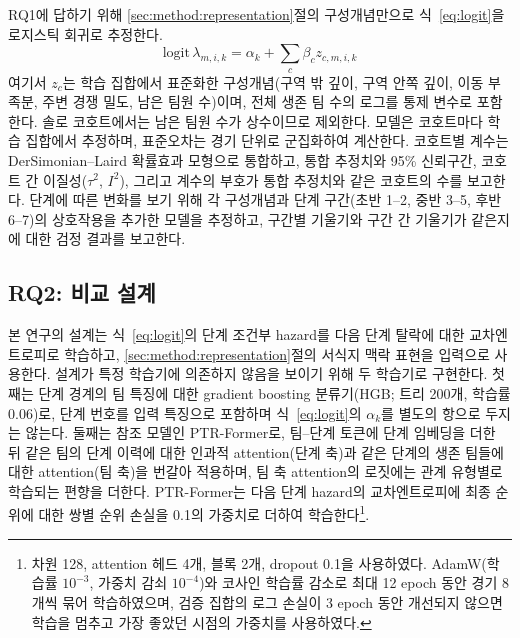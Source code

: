RQ1에 답하기 위해 \ref{sec:method:representation}절의 구성개념만으로 식~\eqref{eq:logit}을 로지스틱 회귀로 추정한다.
\begin{equation}
\mathrm{logit}\,\lambda_{m,i,k}=\alpha_k+\sum_{c}\beta_c z_{c,m,i,k}
\label{eq:ehm}
\end{equation}
여기서 $z_c$는 학습 집합에서 표준화한 구성개념(구역 밖 깊이, 구역 안쪽 깊이, 이동 부족분, 주변 경쟁 밀도, 남은 팀원 수)이며, 전체 생존 팀 수의 로그를 통제 변수로 포함한다.
솔로 코호트에서는 남은 팀원 수가 상수이므로 제외한다.
모델은 코호트마다 학습 집합에서 추정하며, 표준오차는 경기 단위로 군집화하여 계산한다.
코호트별 계수는 DerSimonian--Laird 확률효과 모형으로 통합하고, 통합 추정치와 95\% 신뢰구간, 코호트 간 이질성($\tau^2$, $I^2$), 그리고 계수의 부호가 통합 추정치와 같은 코호트의 수를 보고한다.
단계에 따른 변화를 보기 위해 각 구성개념과 단계 구간(초반 1--2, 중반 3--5, 후반 6--7)의 상호작용을 추가한 모델을 추정하고, 구간별 기울기와 구간 간 기울기가 같은지에 대한 검정 결과를 보고한다.

\subsection{RQ2: 비교 설계}
\label{sec:method:rq2}

본 연구의 설계는 식~\eqref{eq:logit}의 단계 조건부 hazard를 다음 단계 탈락에 대한 교차엔트로피로 학습하고, \ref{sec:method:representation}절의 서식지 맥락 표현을 입력으로 사용한다.
설계가 특정 학습기에 의존하지 않음을 보이기 위해 두 학습기로 구현한다.
첫째는 단계 경계의 팀 특징에 대한 gradient boosting 분류기(HGB; 트리 200개, 학습률 0.06)로, 단계 번호를 입력 특징으로 포함하며 식~\eqref{eq:logit}의 $\alpha_k$를 별도의 항으로 두지는 않는다.
둘째는  참조 모델인 PTR-Former로, 팀--단계 토큰에 단계 임베딩을 더한 뒤 같은 팀의 단계 이력에 대한 인과적 attention(단계 축)과 같은 단계의 생존 팀들에 대한 attention(팀 축)을 번갈아 적용하며, 팀 축 attention의 로짓에는 관계 유형별로 학습되는 편향을 더한다.
PTR-Former는 다음 단계 hazard의 교차엔트로피에 최종 순위에 대한 쌍별 순위 손실을 0.1의 가중치로 더하여 학습한다\footnote{차원 128, attention 헤드 4개, 블록 2개, dropout 0.1을 사용하였다. AdamW(학습률 $10^{-3}$, 가중치 감쇠 $10^{-4}$)와 코사인 학습률 감소로 최대 12 epoch 동안 경기 8개씩 묶어 학습하였으며, 검증 집합의 로그 손실이 3 epoch 동안 개선되지 않으면 학습을 멈추고 가장 좋았던 시점의 가중치를 사용하였다.}.


